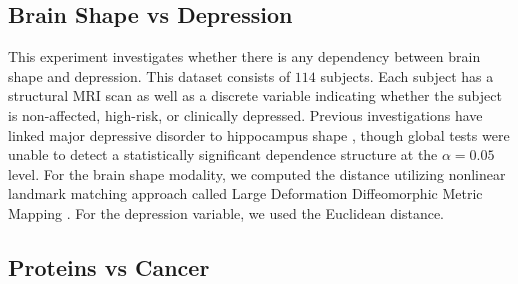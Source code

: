 \documentclass[11pt]{extarticle}
\begin{document}
\subsection{Brain Shape vs Depression}
\label{app:depression}

This experiment investigates whether there is any dependency between brain shape and depression.
This  dataset consists of $114$ subjects. Each subject has a structural MRI scan as well as a discrete variable indicating whether the subject is non-affected, high-risk, or clinically depressed.
Previous investigations have linked major depressive disorder to hippocampus shape \cite{ParkEtAl2008,PosenerEtAl2003}, though global tests were unable to detect a statistically significant dependence structure at the $\alpha=0.05$ level.
For the brain shape modality, we computed the distance utilizing  nonlinear landmark matching approach called Large Deformation Diffeomorphic Metric Mapping
 \cite{ParkEtAl2008,BegEtAl2005}.
For the depression variable, we used the Euclidean distance.



\subsection{Proteins vs Cancer}
\label{app:cancer}
\end{document}
